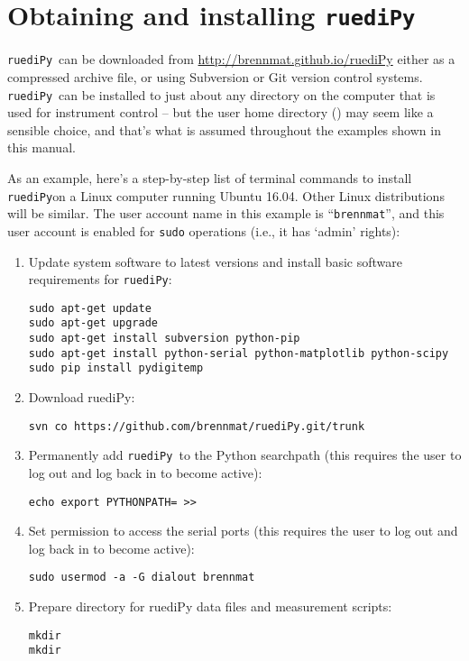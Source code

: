 \documentclass[12pt]{article}   	%
\newcommand{\ruediPy}{\texttt{ruediPy}}
\begin{document}
\section{Obtaining and installing \ruediPy}
\ruediPy\ can be downloaded from \url{http://brennmat.github.io/ruediPy} either as a compressed archive file, or using Subversion or Git version control systems. \ruediPy\ can be installed to just about any directory on the computer that is used for instrument control -- but the user home directory  () may seem like a sensible choice, and that's what is assumed throughout the examples shown in this manual.

As an example, here's a step-by-step list of terminal commands to install \ruediPy  on a Linux computer running Ubuntu 16.04. Other Linux distributions will be similar. The user account name in this example is ``\texttt{brennmat}'', and this user account is enabled for \texttt{sudo} operations (i.e., it has `admin' rights):
\begin{enumerate}

\item Update system software to latest versions and install basic software requirements for \ruediPy:\par
\texttt{sudo apt-get update}\\
\texttt{sudo apt-get upgrade}\\
\texttt{sudo apt-get install subversion python-pip}\\
\texttt{sudo apt-get install python-serial python-matplotlib python-scipy}\\
\texttt{sudo pip install pydigitemp}\\

\item Download ruediPy:\par
\texttt{svn co https://github.com/brennmat/ruediPy.git/trunk }

\item Permanently add \ruediPy\ to the Python searchpath (this requires the user to log out and log back in to become active):\par
\texttt{echo export PYTHONPATH= >> }

\item Set permission to access the serial ports (this requires the user to log out and log back in to become active):\par
\texttt{sudo usermod -a -G dialout brennmat}

\item Prepare directory for ruediPy data files and measurement scripts:\par
\texttt{mkdir }\\
\texttt{mkdir }

\end{enumerate}
\end{document}
